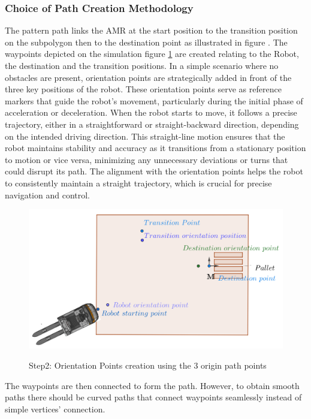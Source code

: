 \subsubsection{Choice of Path Creation Methodology}
The pattern path links the AMR at the start position to the transition position on the subpolygon then to the 
destination point as illustrated in figure . 
The waypoints depicted on the simulation figure \ref{Orientation} 
are created relating to the 
Robot, the destination and the transition positions. In a simple scenario where no obstacles are present, orientation points 
are strategically added in front of the three key positions of the robot. These orientation points serve as reference markers 
that guide the robot's movement, particularly during the initial phase of acceleration or deceleration. When the robot starts 
to move, it follows a precise trajectory, either in a straightforward or straight-backward direction, depending on the 
intended driving direction. This straight-line motion ensures that the robot maintains stability and accuracy as it 
transitions from a stationary position to motion or vice versa, minimizing any unnecessary deviations or turns that could 
disrupt its path. The alignment with the orientation points helps the robot to consistently maintain a straight trajectory, 
which is crucial for precise navigation and control.
\begin{figure}[H]
    \begin{center}
        \includegraphics[width=5in]{images/Chap2/Orientation_points.png}\\
        \caption{Step2: Orientation Points creation using the 3 origin path points}
        \label{Orientation}
        \end{center}    
\end{figure}

The waypoints are then connected to form the path.
However, to obtain smooth paths there should be curved paths that connect waypoints seamlessly instead 
of simple vertices' connection. 

